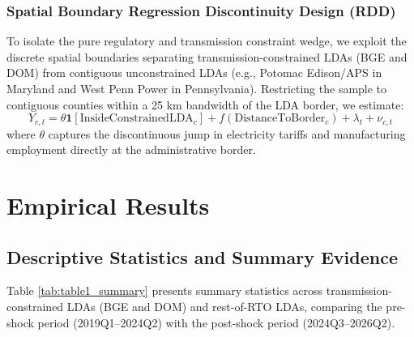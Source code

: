 \documentclass[11pt,a4paper]{article}
\begin{document}
\subsubsection{Spatial Boundary Regression Discontinuity Design (RDD)}
To isolate the pure regulatory and transmission constraint wedge, we exploit the discrete spatial boundaries separating transmission-constrained LDAs (BGE and DOM) from contiguous unconstrained LDAs (e.g., Potomac Edison/APS in Maryland and West Penn Power in Pennsylvania). Restricting the sample to contiguous counties within a 25 km bandwidth of the LDA border, we estimate:
\begin{equation}
    Y_{c,t} = \theta \mathbf{1}[\text{InsideConstrainedLDA}_c] + f(\text{DistanceToBorder}_c) + \lambda_t + \nu_{c,t}
\end{equation}
where $\theta$ captures the discontinuous jump in electricity tariffs and manufacturing employment directly at the administrative border.

\newpage

\section{Empirical Results}\label{sec:results}

\subsection{Descriptive Statistics and Summary Evidence}

Table \ref{tab:table1_summary} presents summary statistics across transmission-constrained LDAs (BGE and DOM) and rest-of-RTO LDAs, comparing the pre-shock period (2019Q1--2024Q2) with the post-shock period (2024Q3--2026Q2).
\end{document}
